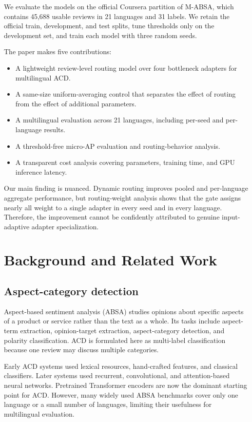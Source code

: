 \documentclass[review,12pt]{elsarticle}
\begin{document}
We evaluate the models on the official Coursera partition of M-ABSA, which contains 45,688 usable reviews in 21 languages and 31 labels. We retain the official train, development, and test splits, tune thresholds only on the development set, and train each model with three random seeds.

The paper makes five contributions:
\begin{itemize}
\item A lightweight review-level routing model over four bottleneck adapters for multilingual ACD.
\item A same-size uniform-averaging control that separates the effect of routing from the effect of additional parameters.
\item A multilingual evaluation across 21 languages, including per-seed and per-language results.
\item A threshold-free micro-AP evaluation and routing-behavior analysis.
\item A transparent cost analysis covering parameters, training time, and GPU inference latency.
\end{itemize}

Our main finding is nuanced. Dynamic routing improves pooled and per-language aggregate performance, but routing-weight analysis shows that the gate assigns nearly all weight to a single adapter in every seed and in every language. Therefore, the improvement cannot be confidently attributed to genuine input-adaptive adapter specialization.

\section{Background and Related Work}

\subsection{Aspect-category detection}
Aspect-based sentiment analysis (ABSA) studies opinions about specific aspects of a product or service rather than the text as a whole. Its tasks include aspect-term extraction, opinion-target extraction, aspect-category detection, and polarity classification. ACD is formulated here as multi-label classification because one review may discuss multiple categories.

Early ACD systems used lexical resources, hand-crafted features, and classical classifiers. Later systems used recurrent, convolutional, and attention-based neural networks. Pretrained Transformer encoders are now the dominant starting point for ACD. However, many widely used ABSA benchmarks cover only one language or a small number of languages, limiting their usefulness for multilingual evaluation.
\end{document}
